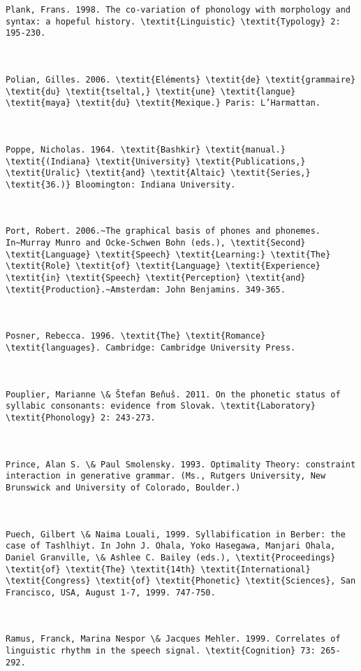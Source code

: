 \begin{verbatim}
Plank, Frans. 1998. The co-variation of phonology with morphology and syntax: a hopeful history. \textit{Linguistic} \textit{Typology} 2: 195-230.



Polian, Gilles. 2006. \textit{Eléments} \textit{de} \textit{grammaire} \textit{du} \textit{tseltal,} \textit{une} \textit{langue} \textit{maya} \textit{du} \textit{Mexique.} Paris: L’Harmattan.



Poppe, Nicholas. 1964. \textit{Bashkir} \textit{manual.} \textit{(Indiana} \textit{University} \textit{Publications,} \textit{Uralic} \textit{and} \textit{Altaic} \textit{Series,} \textit{36.)} Bloomington: Indiana University.



Port, Robert. 2006.~The graphical basis of phones and phonemes. In~Murray Munro and Ocke-Schwen Bohn (eds.), \textit{Second} \textit{Language} \textit{Speech} \textit{Learning:} \textit{The} \textit{Role} \textit{of} \textit{Language} \textit{Experience} \textit{in} \textit{Speech} \textit{Perception} \textit{and} \textit{Production}.~Amsterdam: John Benjamins. 349-365.



Posner, Rebecca. 1996. \textit{The} \textit{Romance} \textit{languages}. Cambridge: Cambridge University Press.



Pouplier, Marianne \& Štefan Beňuš. 2011. On the phonetic status of syllabic consonants: evidence from Slovak. \textit{Laboratory} \textit{Phonology} 2: 243-273.



Prince, Alan S. \& Paul Smolensky. 1993. Optimality Theory: constraint interaction in generative grammar. (Ms., Rutgers University, New Brunswick and University of Colorado, Boulder.)



Puech, Gilbert \& Naima Louali, 1999. Syllabification in Berber: the case of Tashlhiyt. In John J. Ohala, Yoko Hasegawa, Manjari Ohala, Daniel Granville, \& Ashlee C. Bailey (eds.), \textit{Proceedings} \textit{of} \textit{The} \textit{14th} \textit{International} \textit{Congress} \textit{of} \textit{Phonetic} \textit{Sciences}, San Francisco, USA, August 1-7, 1999. 747-750.



Ramus, Franck, Marina Nespor \& Jacques Mehler. 1999. Correlates of linguistic rhythm in the speech signal. \textit{Cognition} 73: 265-292.




\end{verbatim}
